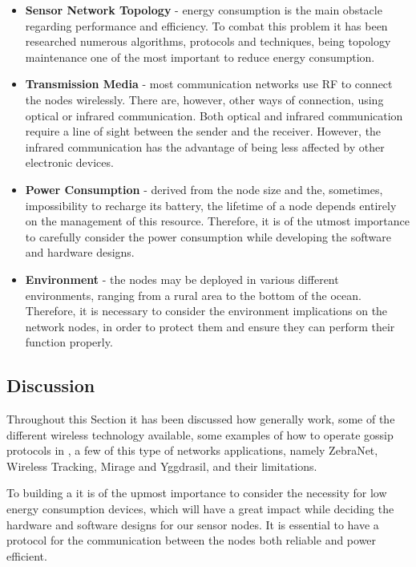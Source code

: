 \begin{itemize}
\begin{figure}[H]
                  \label{fig:sensor_components}
            \end{figure}
      \item \textbf{Sensor Network Topology} - energy consumption is the main obstacle regarding
             performance and efficiency. To combat this problem it has been
            researched numerous algorithms, protocols and techniques, being topology maintenance
            one of the most important to reduce energy consumption.
      \item \textbf{Transmission Media} - most communication networks use \Gls{RF} to connect
            the nodes wirelessly. There are, however, other ways of connection, using optical or
            infrared communication. Both optical and infrared communication require a line of
            sight between the sender and the receiver. However, the infrared communication has
            the advantage of being less affected by other electronic devices.
      \item \textbf{Power Consumption} - derived from the node size and the, sometimes,
            impossibility to recharge its battery, the lifetime of a node depends entirely
            on the management of this resource. Therefore, it is of the utmost importance to
            carefully consider the power consumption while developing the software and hardware
            designs.
      \item \textbf{Environment} - the nodes may be deployed in various different environments,
            ranging from a rural area to the bottom of the ocean. Therefore, it is necessary to
            consider the environment implications on the network nodes, in order to protect them
            and ensure they can perform their function properly.
\end{itemize}


\subsection{Discussion}
Throughout this Section it has been discussed how  generally work,  some of the
different wireless technology available, some examples of how to operate gossip protocols in
, a few of this type of networks applications, namely ZebraNet, Wireless Tracking,
Mirage and Yggdrasil, and their limitations.

To building a  it is of the upmost importance to consider the necessity for
low energy consumption devices, which will have a great impact while deciding the hardware
and software designs for our sensor nodes. It is essential to have a protocol for the
communication between the nodes both reliable and power efficient.

